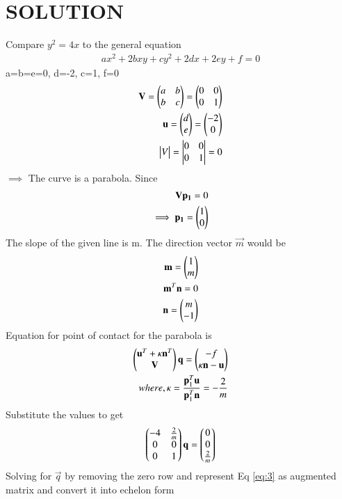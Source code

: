 \documentclass[journal,12pt,twocolumn]{IEEEtran}
\begin{document}
\section{SOLUTION}
Compare $y^2 = 4x$ to the general equation
\begin{align}
    ax^2 + 2bxy + cy^2 + 2dx + 2ey + f = 0
\end{align}
a=b=e=0, d=-2, c=1, f=0
\begin{align}
  \mathbf{V} = \begin{pmatrix}a & b \\ b & c\end{pmatrix} = \begin{pmatrix}0 & 0 \\ 0 & 1\end{pmatrix}\\
  \mathbf{u} = \begin{pmatrix}d \\ e\end{pmatrix} = \begin{pmatrix}-2 \\ 0\end{pmatrix}\\
  \begin{vmatrix}V\end{vmatrix} = \begin{vmatrix}0 & 0 \\ 0 & 1\end{vmatrix} = 0
\end{align}
 $\implies$ The curve is a parabola. Since
\begin{align}
     \mathbf{Vp_{1}} = 0\\
    \implies \mathbf{p_{1}} = \begin{pmatrix}1 \\ 0\end{pmatrix}
\end{align}
The slope of the given line is m. The direction vector $\vec{m}$ would be
\begin{align}
   \mathbf{m} = \begin{pmatrix}1 \\ m\end{pmatrix}\\
   \mathbf{m}^T\mathbf{n} = 0\\
   \mathbf{n} = \begin{pmatrix}m \\ -1\end{pmatrix}
\end{align}
Equation for point of contact for the parabola is 
\begin{align}
    \begin{pmatrix}\mathbf{u}^T + \kappa \mathbf{n}^T \\ \mathbf{V}\end{pmatrix}\mathbf{q} = \begin{pmatrix}-f \\ \kappa \mathbf{n} - \mathbf{u}\end{pmatrix}\\
   where, \kappa = \frac{\mathbf{p}_{1}^T \mathbf{u}}{\mathbf{p}_{1}^T \mathbf{n}} = - \frac{2}{m}
\end{align}
Substitute the values to get
\begin{align}
   \begin{pmatrix}-4 & \frac{2}{m} \\ 0 & 0 \\ 0 & 1\end{pmatrix}\mathbf{q} = \begin{pmatrix}0 \\ 0 \\ \frac{2}{m}\end{pmatrix} \label{eq:3}
\end{align}
Solving for $\vec{q}$ by removing the zero row and represent Eq \eqref{eq:3} as augmented matrix and convert it into echelon form
\end{document}
